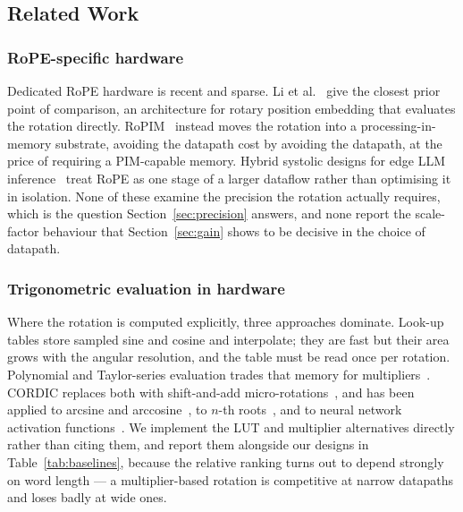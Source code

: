 %
%

\subsection{Related Work}
\label{sec:related}

\subsubsection{RoPE-specific hardware}
Dedicated RoPE hardware is recent and sparse. Li et al.~\cite{standard_cordic_rope}
give the closest prior point of comparison, an architecture for rotary position
embedding that evaluates the rotation directly. RoPIM~\cite{c23} instead moves
the rotation into a processing-in-memory substrate, avoiding the datapath cost
by avoiding the datapath, at the price of requiring a PIM-capable memory.
Hybrid systolic designs for edge LLM inference~\cite{c6} treat RoPE as one
stage of a larger dataflow rather than optimising it in isolation. None of
these examine the precision the rotation actually requires, which is the
question Section~\ref{sec:precision} answers, and none report the scale-factor
behaviour that Section~\ref{sec:gain} shows to be decisive in the choice of
datapath.

\subsubsection{Trigonometric evaluation in hardware}
Where the rotation is computed explicitly, three approaches dominate.
Look-up tables store sampled sine and cosine and interpolate; they are fast
but their area grows with the angular resolution, and the table must be read
once per rotation. Polynomial and Taylor-series evaluation trades that memory
for multipliers~. CORDIC replaces both with shift-and-add
micro-rotations~\cite{c2, c3, c15}, and has been applied to arcsine and
arccosine~\cite{c5, c20, c21}, to $n$-th roots~\cite{c10}, and to neural
network activation functions~\cite{c16, c18, c19, c22}. We implement the LUT
and multiplier alternatives directly rather than citing them, and report them
alongside our designs in Table~\ref{tab:baselines}, because the relative
ranking turns out to depend strongly on word length --- a multiplier-based
rotation is competitive at narrow datapaths and loses badly at wide ones.

